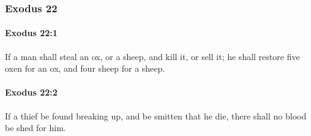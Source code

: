 	\subsubsection{Exodus 22} %
		\label{EXODUS-22}

		\paragraph{Exodus 22:1} %
			\label{EXODUS-22-1}

			If a man shall steal an ox, or a sheep, and kill it, or sell it; he shall restore five oxen for an ox, and four sheep for a sheep.


		\paragraph{Exodus 22:2} %
			\label{EXODUS-22-2}

			If a thief be found breaking up, and be smitten that he die, there shall no blood be shed for him.

